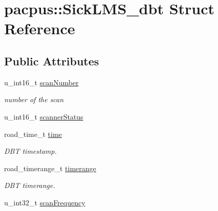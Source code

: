 \hypertarget{structpacpus_1_1SickLMS__dbt}{\section{pacpus\-:\-:Sick\-L\-M\-S\-\_\-dbt Struct Reference}
\label{structpacpus_1_1SickLMS__dbt}
}
\subsection*{Public Attributes}
\begin{DoxyCompactItemize}
\item 
\hypertarget{structpacpus_1_1SickLMS__dbt_a43c6abf5a37f9432442e25c95e375e90}{u\-\_\-int16\-\_\-t \hyperlink{structpacpus_1_1SickLMS__dbt_a43c6abf5a37f9432442e25c95e375e90}{scan\-Number}}\label{structpacpus_1_1SickLMS__dbt_a43c6abf5a37f9432442e25c95e375e90}

\begin{DoxyCompactList}\small\item\em number of the scan \end{DoxyCompactList}\item 
u\-\_\-int16\-\_\-t \hyperlink{structpacpus_1_1SickLMS__dbt_a10e25b3d9019c08a41ea8f52fc323345}{scanner\-Status}
\item 
\hypertarget{structpacpus_1_1SickLMS__dbt_a46f6d62185441de61f75581c19efa7a3}{road\-\_\-time\-\_\-t \hyperlink{structpacpus_1_1SickLMS__dbt_a46f6d62185441de61f75581c19efa7a3}{time}}\label{structpacpus_1_1SickLMS__dbt_a46f6d62185441de61f75581c19efa7a3}

\begin{DoxyCompactList}\small\item\em D\-B\-T timestamp. \end{DoxyCompactList}\item 
\hypertarget{structpacpus_1_1SickLMS__dbt_a5fc03bad1484c48a8dafb98d7d3b4f52}{road\-\_\-timerange\-\_\-t \hyperlink{structpacpus_1_1SickLMS__dbt_a5fc03bad1484c48a8dafb98d7d3b4f52}{timerange}}\label{structpacpus_1_1SickLMS__dbt_a5fc03bad1484c48a8dafb98d7d3b4f52}

\begin{DoxyCompactList}\small\item\em D\-B\-T timerange. \end{DoxyCompactList}\item 
\hypertarget{structpacpus_1_1SickLMS__dbt_a578213dd3cc30c4990911398d52cb8cf}{u\-\_\-int32\-\_\-t \hyperlink{structpacpus_1_1SickLMS__dbt_a578213dd3cc30c4990911398d52cb8cf}{scan\-Frequency}}\label{structpacpus_1_1SickLMS__dbt_a578213dd3cc30c4990911398d52cb8cf}


\end{DoxyCompactItemize}

